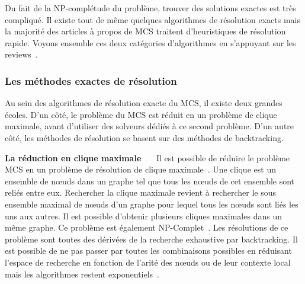 Du fait de la NP-complétude du problème, trouver des solutions exactes est très compliqué.
Il existe tout de même quelques algorithmes de résolution exacts mais la majorité des articles à propos de MCS traitent d'heuristiques de résolution rapide.
Voyons ensemble ces deux catégories d'algorithmes en s'appuyant sur les reviews~\cite{raymond_maximum_2002, ehrlich_maximum_2011}.


\subsubsection{Les méthodes exactes de résolution}

Au sein des algorithmes de résolution exacte du MCS, il existe deux grandes écoles.
D'un côté, le problème du MCS est réduit en un problème de clique maximale, avant d'utiliser des solveurs dédiés à ce second problème.
D'un autre côté, les méthodes de résolution se basent sur des méthodes de backtracking.



\textbf{La réduction en clique maximale}~~~
Il est possible de réduire le problème MCS en un problème de résolution de clique maximale~\cite{pelillo_matching_1999,grosso_simple_2008,rahman_small_2009}.
Une clique est un ensemble de n\oe{}uds dans un graphe tel que tous les n\oe{}uds de cet ensemble sont reliés entre eux.
Rechercher la clique maximale revient à rechercher le sous ensemble maximal de n\oe{}uds d'un graphe pour lequel tous les n\oe{}uds sont liés les uns aux autres.
Il est possible d'obtenir plusieurs cliques maximales dans un même graphe.
Ce problème est également NP-Complet~\cite{akkoyunlu_enumeration_1973}.
Les résolutions de ce problème sont toutes des dérivées de la recherche exhaustive par backtracking.
Il est possible de ne pas passer par toutes les combinaisons possibles en réduisant l'espace de recherche en fonction de l'arité des n\oe{}uds ou de leur contexte local mais les algorithmes restent exponentiels~\cite{tomita_worst-case_2004}.

